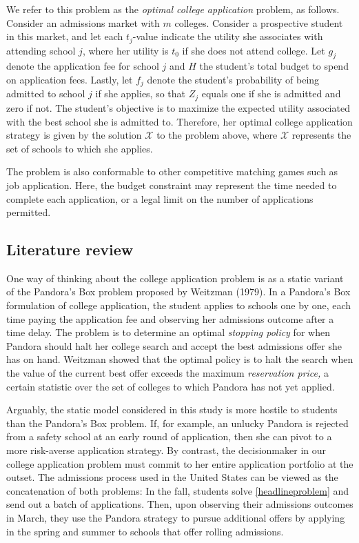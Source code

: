 \documentclass[11pt]{article} %
\theoremstyle{definition}
\begin{document}
We refer to this problem as the \emph{optimal college application} problem, as follows. Consider an admissions market with $m$ colleges. Consider a prospective student in this market, and let each $t_j$-value indicate the utility she associates with attending school $j$, where her utility is $t_0$ if she does not attend college. Let $g_j$ denote the application fee for school $j$ and $H$ the student's total budget to spend on application fees. Lastly, let $f_j$ denote the student's probability of being admitted to school $j$ if she applies, so that $Z_j$ equals one if she is admitted and zero if not. The student's objective is to maximize the expected utility associated with the best school she is admitted to. Therefore, her optimal college application strategy is given by the solution $\mathcal{X}$ to the problem above, where $\mathcal{X}$ represents the set of schools to which she applies. 

The problem is also conformable to other competitive matching games such as job application. Here, the budget constraint may represent the time needed to complete each application, or a legal limit on the number of applications permitted.

\subsection{Literature review}
One way of thinking about the college application problem is as a static variant of the Pandora's Box problem proposed by Weitzman (1979). In a Pandora's Box formulation of college application, the student applies to schools one by one, each time paying the application fee and observing her admissions outcome after a time delay. The problem is to determine an optimal \emph{stopping policy} for when Pandora should halt her college search and accept the best admissions offer she has on hand. Weitzman showed that the optimal policy is to halt the search when the value of the current best offer exceeds the maximum \emph{reservation price,} a certain statistic over the set of colleges to which Pandora has not yet applied.

Arguably, the static model considered in this study is more hostile to students than the Pandora's Box problem. If, for example, an unlucky Pandora is rejected from a safety school at an early round of application, then she can pivot to a more risk-averse application strategy. By contrast, the decisionmaker in our college application problem must commit to her entire application portfolio at the outset. The admissions process used in the United States can be viewed as the concatenation of both problems: In the fall, students solve \eqref{headlineproblem} and send out a batch of applications. Then, upon observing their admissions outcomes in March, they use the Pandora strategy to pursue additional offers by applying in the spring and summer to schools that offer rolling admissions.
\end{document}
